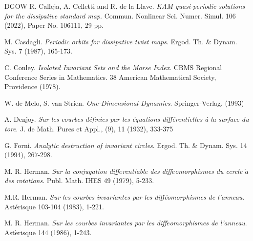 \documentclass{amsart}
\theoremstyle{definition}
\begin{document}
\begin{thebibliography}{DGOW}
 R. Calleja, A. Celletti and R. de la Llave. {\it KAM quasi-periodic solutions for the dissipative standard map}. Commun. Nonlinear Sci. Numer. Simul. 106 (2022), Paper No. 106111, 29 pp.




 M. Casdagli. {\it Periodic orbits for dissipative twist maps}. Ergod. Th. \& Dynam. Sys. {7} (1987), 165-173.



 C. Conley. {\it Isolated Invariant Sets and the Morse Index}. CBMS Regional Conference Series in Mathematics. {38} American Mathematical Society, Providence (1978).



  W. de Melo, S. van Strien. {\it One-Dimensional Dynamics}. Springer-Verlag. (1993)


 A. Denjoy.
{\it Sur les courbes d\'{e}finies par les \'{e}quations diff\'{e}rentielles \`{a} la surface du tore}. J. de Math. Pures et Appl.,
 (9), 11 (1932), 333-375




 G. Forni. {\it
Analytic destruction of invariant circles}. Ergod.
 Th. \& Dynam. Sys. {14} (1994), 267-298.




  M. R. Herman. {\it Sur la conjugation diff$\acute{e}$rentiable des diff$\acute{e}$omorphismes du cercle $\grave{a}$ des
 rotations}. Publ. Math. IHES {49} (1979), 5-233.


 M.R. Herman. {\it Sur les courbes invariantes par les diff\'{e}omorphismes de
 l'anneau}. Ast\'{e}risque {103-104} (1983), 1-221.

 M. R. Herman.  {\it Sur les courbes invariantes par les
diff$\acute{e}$omorphismes de
 l'anneau}. Ast$\acute{\text{e}}$risque {144} (1986), 1-243.


\end{thebibliography}
\end{document}
